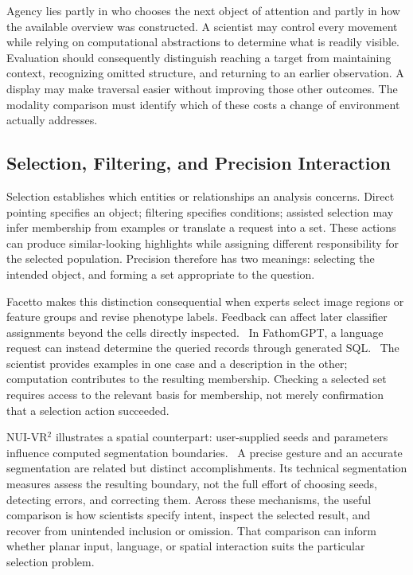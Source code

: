 Agency lies partly in who chooses the next object of attention and partly in how the available overview was constructed. A scientist may control every movement while relying on computational abstractions to determine what is readily visible. Evaluation should consequently distinguish reaching a target from maintaining context, recognizing omitted structure, and returning to an earlier observation. A display may make traversal easier without improving those other outcomes. The modality comparison must identify which of these costs a change of environment actually addresses.

\subsection{Selection, Filtering, and Precision Interaction}
\label{sec:tasks-selection}

Selection establishes which entities or relationships an analysis concerns. Direct pointing specifies an object; filtering specifies conditions; assisted selection may infer membership from examples or translate a request into a set. These actions can produce similar-looking highlights while assigning different responsibility for the selected population. Precision therefore has two meanings: selecting the intended object, and forming a set appropriate to the question.

Facetto makes this distinction consequential when experts select image regions or feature groups and revise phenotype labels. Feedback can affect later classifier assignments beyond the cells directly inspected.~\cite{AnchorFacetto} In FathomGPT, a language request can instead determine the queried records through generated SQL.~\cite{AnchorFathomGPT} The scientist provides examples in one case and a description in the other; computation contributes to the resulting membership. Checking a selected set requires access to the relevant basis for membership, not merely confirmation that a selection action succeeded.

NUI-VR$^2$ illustrates a spatial counterpart: user-supplied seeds and parameters influence computed segmentation boundaries.~\cite{AnchorNUIVR} A precise gesture and an accurate segmentation are related but distinct accomplishments. Its technical segmentation measures assess the resulting boundary, not the full effort of choosing seeds, detecting errors, and correcting them. Across these mechanisms, the useful comparison is how scientists specify intent, inspect the selected result, and recover from unintended inclusion or omission. That comparison can inform whether planar input, language, or spatial interaction suits the particular selection problem.

